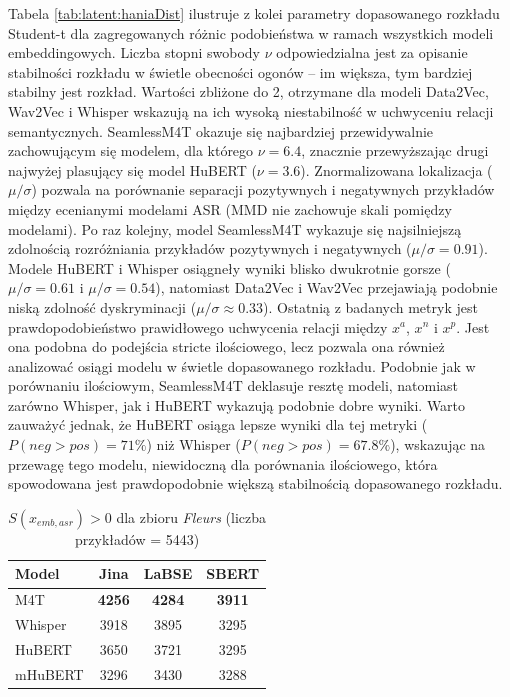 Tabela \ref{tab:latent:haniaDist} ilustruje z kolei parametry dopasowanego rozkładu Student-t dla zagregowanych różnic podobieństwa w ramach wszystkich modeli embeddingowych. Liczba stopni swobody $\nu$ odpowiedzialna jest za opisanie stabilności rozkładu w świetle obecności ogonów -- im większa, tym bardziej stabilny jest rozkład. Wartości zbliżone do 2, otrzymane dla modeli Data2Vec, Wav2Vec i Whisper wskazują na ich wysoką niestabilność w uchwyceniu relacji semantycznych. SeamlessM4T okazuje się najbardziej przewidywalnie zachowującym się modelem, dla którego $\nu = 6.4$, znacznie przewyższając drugi najwyżej plasujący się model HuBERT ($\nu = 3.6$). Znormalizowana lokalizacja ($\mu/\sigma$) pozwala na porównanie separacji pozytywnych i negatywnych przykładów między ecenianymi modelami ASR (MMD nie zachowuje skali pomiędzy modelami). Po raz kolejny, model SeamlessM4T wykazuje się najsilniejszą zdolnością rozróżniania przykładów pozytywnych i negatywnych ($\mu/\sigma = 0.91$). Modele HuBERT i Whisper osiągneły wyniki blisko dwukrotnie gorsze ($\mu/\sigma = 0.61$ i $\mu/\sigma = 0.54$), natomiast Data2Vec i Wav2Vec przejawiają podobnie niską zdolność dyskryminacji ($\mu/\sigma \approx 0.33$). Ostatnią z badanych metryk jest prawdopodobieństwo prawidłowego uchwycenia relacji między $x^a$, $x^n$ i $x^p$. Jest ona podobna do podejścia stricte ilościowego, lecz pozwala ona również analizować osiągi modelu w świetle dopasowanego rozkładu. Podobnie jak w porównaniu ilościowym, SeamlessM4T deklasuje resztę modeli, natomiast zarówno Whisper, jak i HuBERT wykazują podobnie dobre wyniki. Warto zauważyć jednak, że HuBERT osiąga lepsze wyniki dla tej metryki ($P(neg > pos) = 71\%$) niż Whisper ($P(neg>pos) = 67.8\%$), wskazując na przewagę tego modelu, niewidoczną dla porównania ilościowego, która spowodowana jest prawdopodobnie większą stabilnością dopasowanego rozkładu.

\begin{table}[!ht]
\centering
\caption{$S(x_{emb,asr}) > 0$ dla zbioru \textit{Fleurs} (liczba przykładów = 5443)}
\label{tab:latent:fleursCounts}
\begin{tabular}{lccc}
\toprule
\textbf{Model} & \textbf{Jina} & \textbf{LaBSE} & \textbf{SBERT} \\
\midrule
M4T  & \textbf{4256} & \textbf{4284} & \textbf{3911} \\
Whisper  & 3918 & 3895 & 3295 \\
HuBERT  & 3650 & 3721 & 3295 \\
mHuBERT   & 3296 & 3430 & 3288 \\
\bottomrule
\end{tabular}
\end{table}

